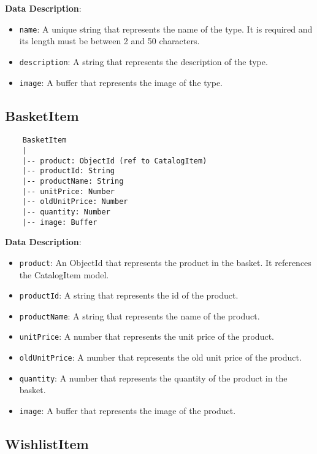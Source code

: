\textbf{Data Description}:

\begin{itemize}
    \item \texttt{name}: A unique string that represents the name of the type. It is required and its length must be between 2 and 50 characters.
    \item \texttt{description}: A string that represents the description of the type.
    \item \texttt{image}: A buffer that represents the image of the type.
\end{itemize}

\subsection{BasketItem}

\begin{verbatim}
    BasketItem
    |
    |-- product: ObjectId (ref to CatalogItem)
    |-- productId: String
    |-- productName: String
    |-- unitPrice: Number
    |-- oldUnitPrice: Number
    |-- quantity: Number
    |-- image: Buffer
    \end{verbatim}

\textbf{Data Description}:

\begin{itemize}
    \item \texttt{product}: An ObjectId that represents the product in the basket. It references the CatalogItem model.
    \item \texttt{productId}: A string that represents the id of the product.
    \item \texttt{productName}: A string that represents the name of the product.
    \item \texttt{unitPrice}: A number that represents the unit price of the product.
    \item \texttt{oldUnitPrice}: A number that represents the old unit price of the product.
    \item \texttt{quantity}: A number that represents the quantity of the product in the basket.
    \item \texttt{image}: A buffer that represents the image of the product.
\end{itemize}

\subsection{WishlistItem}

